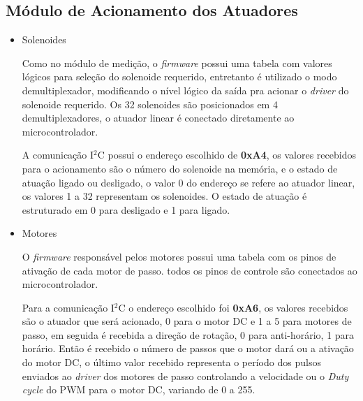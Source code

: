\subsection{Módulo de Acionamento dos Atuadores}
\begin{itemize}
    \item Solenoides
    
    Como no módulo de medição, o \textit{firmware} possui uma tabela com valores lógicos para seleção do solenoide requerido, entretanto é utilizado o modo demultiplexador, modificando o nível lógico da saída pra acionar o \textit{driver} do solenoide requerido. Os 32 solenoides são posicionados em 4 demultiplexadores, o atuador linear é conectado diretamente ao microcontrolador.
    
    A comunicação I$^2$C possui o endereço escolhido de \textbf{0xA4}, os valores recebidos para o acionamento são o número do solenoide na memória, e o estado de atuação ligado ou desligado, o valor 0 do endereço se refere ao atuador linear, os valores 1 a 32 representam os solenoides. O estado de atuação é estruturado em 0 para desligado e 1 para ligado.  
    
    \item Motores
    
    O \textit{firmware} responsável pelos motores possui uma tabela com os pinos de ativação de cada motor de passo. todos os pinos de controle são conectados ao microcontrolador.
    
    Para a comunicação I$^2$C o endereço escolhido foi \textbf{0xA6}, os valores recebidos são o atuador que será acionado, 0 para o motor DC e 1 a 5 para motores de passo, em seguida é recebida a direção de rotação, 0 para anti-horário, 1 para horário. Então é recebido o número de passos que o motor dará ou a ativação do motor DC, o último valor recebido representa o período dos pulsos enviados ao \textit{driver} dos motores de passo controlando a velocidade ou o \textit{Duty cycle} do PWM para o motor DC, variando de 0 a 255.
\end{itemize}

